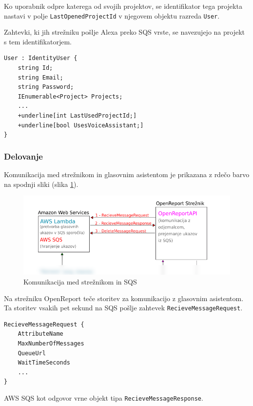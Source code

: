 \documentclass[a4paper, 12pt]{book}
\begin{document}
Ko uporabnik odpre katerega od svojih projektov, se identifikator tega projekta nastavi v polje \texttt{LastOpenedProjectId} v njegovem objektu razreda \texttt{User}.

Zahtevki, ki jih strežniku pošlje Alexa preko SQS vrste, se navezujejo na projekt s tem identifikatorjem.

\begin{Verbatim}[commandchars=+\[\]]
User : IdentityUser {
    string Id; 
    string Email;
    string Password; 
    IEnumerable<Project> Projects;
    ... 
    +underline[int LastUsedProjectId;]
    +underline[bool UsesVoiceAssistant;]
}
\end{Verbatim}

\subsubsection{Delovanje}

Komunikacija med strežnikom in glasovnim asistentom je prikazana z rdečo barvo na spodnji sliki (slika \ref{plan_sqs_server}).

\begin{figure}[H]
\begin{center}
\includegraphics[width=13cm]{plan_sqs_server}
\end{center}
\caption{Komunikacija med strežnikom in SQS}
\label{plan_sqs_server}
\end{figure}

Na strežniku OpenReport teče storitev za komunikacijo z glasovnim asistentom.
Ta storitev vsakih pet sekund na SQS pošlje zahtevek \texttt{RecieveMessageRequest}.

\begin{Verbatim}[commandchars=+\[\]]
RecieveMessageRequest {
    AttributeName 
    MaxNumberOfMessages 
    QueueUrl 
    WaitTimeSeconds
    ... 
} 
\end{Verbatim}

AWS SQS kot odgovor vrne objekt tipa \texttt{RecieveMessageResponse}.
\end{document}
